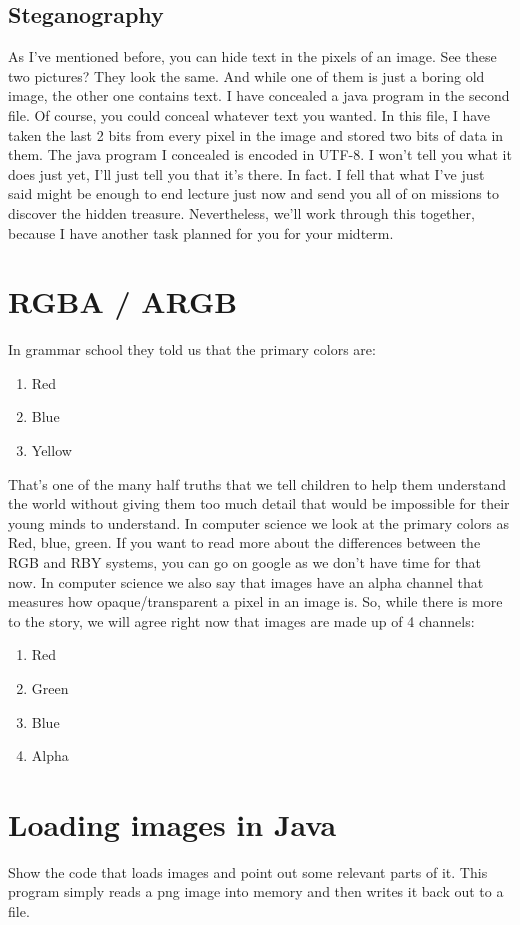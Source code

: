 \documentclass[12pt]{article}
\begin{document}
\subsection{Steganography}
As I've mentioned before, you can hide text in the pixels of an image.
See these two pictures? They look the same. And while one of them is just a boring old image, the other one contains text. I have concealed a java program in the second file. Of course, you could conceal whatever text you wanted. In this file, I have taken the last 2 bits from every pixel in the image and stored two bits of data in them. The java program I concealed is encoded in UTF-8. I won't tell you what it does just yet, I'll just tell you that it's there. In fact. I fell that what I've just said might be enough to end lecture just now and send you all of on missions to discover the hidden treasure. Nevertheless, we'll work through this together, because I have another task planned for you for your midterm. 

 
\section{RGBA / ARGB}
In grammar school they told us that the primary colors are:
\begin{enumerate}
\item Red
\item Blue
\item Yellow
\end{enumerate}
That's one of the many half truths that we tell children to help them understand the world without giving them too much detail that would be impossible for their young minds to understand. In computer science we look at the primary colors as Red, blue, green. If you want to read more about the differences between the RGB and RBY systems, you can go on google as we don't have time for that now. In computer science we also say that images have an alpha channel that measures how opaque/transparent a pixel in an image is. So, while there is more to the story, we will agree right now that images are made up of 4 channels:
\begin{enumerate}
\item Red
\item Green
\item Blue
\item Alpha
\end{enumerate}

\section{Loading images in Java}
Show the code that loads images and point out some relevant parts of it. This program simply reads a png image into memory and then writes it back out to a file. 
\end{document}
